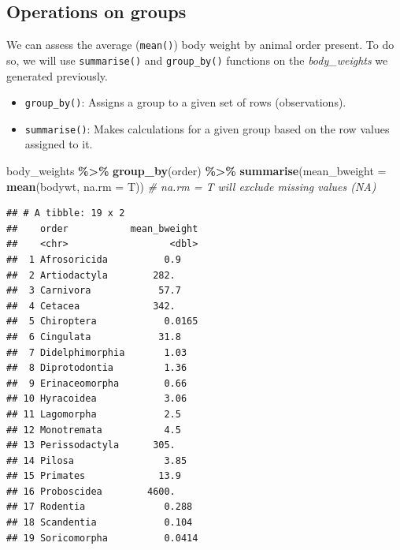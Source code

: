 \documentclass[
]{book}
\newenvironment{Shaded}{\begin{snugshade}}{\end{snugshade}}
\newcommand{\AttributeTok}[1]{\textcolor[rgb]{0.13,0.29,0.53}{#1}}
\newcommand{\CommentTok}[1]{\textcolor[rgb]{0.56,0.35,0.01}{\textit{#1}}}
\newcommand{\FunctionTok}[1]{\textcolor[rgb]{0.13,0.29,0.53}{\textbf{#1}}}
\newcommand{\NormalTok}[1]{#1}
\newcommand{\SpecialCharTok}[1]{\textcolor[rgb]{0.81,0.36,0.00}{\textbf{#1}}}
\providecommand{\tightlist}{%
  \setlength{\itemsep}{0pt}\setlength{\parskip}{0pt}}
\begin{document}
\hypertarget{operations-on-groups}{%
\subsection*{Operations on groups}\label{operations-on-groups}}

We can assess the average (\texttt{mean()}) body weight by animal order present.
To do so, we will use \texttt{summarise()} and \texttt{group\_by()} functions on the \emph{body\_weights} we generated previously.

\begin{itemize}
\tightlist
\item
  \texttt{group\_by()}: Assigns a group to a given set of rows (observations).\\
\item
  \texttt{summarise()}: Makes calculations for a given group based on the row values assigned to it.
\end{itemize}

\begin{Shaded}
\begin{Highlighting}[]
\NormalTok{body\_weights }\SpecialCharTok{\%\textgreater{}\%} 
  \FunctionTok{group\_by}\NormalTok{(order) }\SpecialCharTok{\%\textgreater{}\%}
  \FunctionTok{summarise}\NormalTok{(}\AttributeTok{mean\_bweight =} \FunctionTok{mean}\NormalTok{(bodywt, }\AttributeTok{na.rm =}\NormalTok{ T)) }\CommentTok{\# na.rm = T will exclude missing values (NA)}
\end{Highlighting}
\end{Shaded}

\begin{verbatim}
## # A tibble: 19 x 2
##    order           mean_bweight
##    <chr>                  <dbl>
##  1 Afrosoricida          0.9   
##  2 Artiodactyla        282.    
##  3 Carnivora            57.7   
##  4 Cetacea             342.    
##  5 Chiroptera            0.0165
##  6 Cingulata            31.8   
##  7 Didelphimorphia       1.03  
##  8 Diprotodontia         1.36  
##  9 Erinaceomorpha        0.66  
## 10 Hyracoidea            3.06  
## 11 Lagomorpha            2.5   
## 12 Monotremata           4.5   
## 13 Perissodactyla      305.    
## 14 Pilosa                3.85  
## 15 Primates             13.9   
## 16 Proboscidea        4600.    
## 17 Rodentia              0.288 
## 18 Scandentia            0.104 
## 19 Soricomorpha          0.0414
\end{verbatim}
\end{document}
